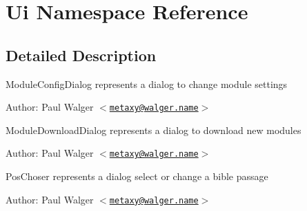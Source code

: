 \hypertarget{namespaceUi}{
\section{Ui Namespace Reference}
\label{namespaceUi}
}


\subsection{Detailed Description}
ModuleConfigDialog represents a dialog to change module settings

\begin{Desc}
\item[Author:]Paul Walger $<$\href{mailto:metaxy@walger.name}{\tt metaxy@walger.name}$>$\end{Desc}
ModuleDownloadDialog represents a dialog to download new modules

\begin{Desc}
\item[Author:]Paul Walger $<$\href{mailto:metaxy@walger.name}{\tt metaxy@walger.name}$>$\end{Desc}
PosChoser represents a dialog select or change a bible passage

\begin{Desc}
\item[Author:]Paul Walger $<$\href{mailto:metaxy@walger.name}{\tt metaxy@walger.name}$>$ \end{Desc}


